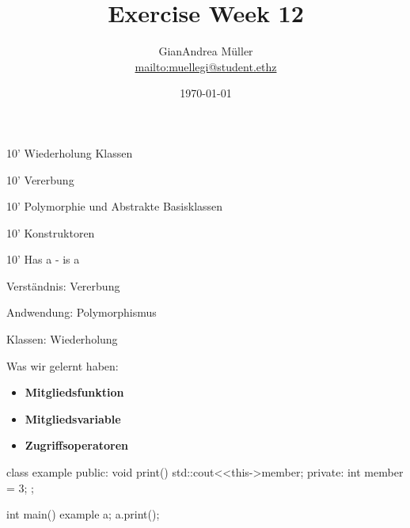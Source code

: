 \ifnum\conditionmacro=1 \documentclass[handout,usenames,dvipsnames]{beamer}\fi
\title{Exercise Week 12}
\author{GianAndrea Müller\\ \url{mailto:muellegi@student.ethz}}
\date{\today}
\begin{document}
\maketitle

\begin{TFTimeSchedule}
\item 10' Wiederholung Klassen
\item 10' Vererbung
\item 10' Polymorphie und Abstrakte Basisklassen
\item 10' Konstruktoren
\item 10' Has a - is a
\end{TFTimeSchedule}

\begin{TFLearningObjectives}
\item Verständnis: Vererbung
\item Andwendung: Polymorphismus
\end{TFLearningObjectives}

\begin{frame}[fragile]{Klassen: Wiederholung}
\begin{block}{Was wir gelernt haben:}
\begin{itemize}
\item \textbf{Mitgliedsfunktion}
\item \textbf{Mitgliedsvariable}
\item \textbf{Zugriffsoperatoren}
\end{itemize}
\end{block}

\begin{TPCpp}
class example {
public:
	void print() {std::cout<<this->member;}
private:
	int member = 3;
};

int main(){
	example a;
	a.print();
}
\end{TPCpp}
\end{frame}

\end{document}
